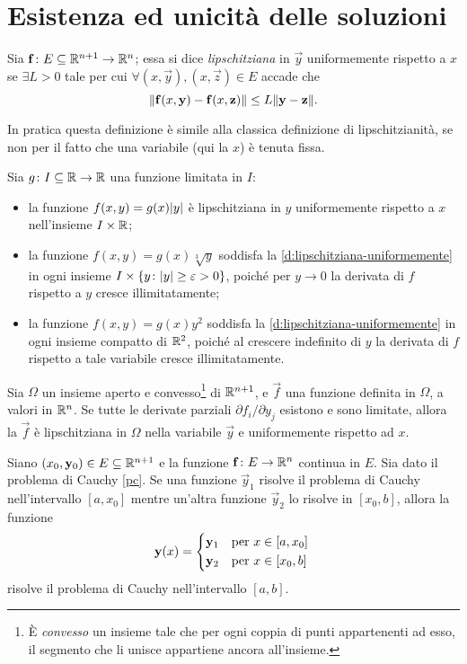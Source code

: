 \section{Esistenza ed unicità delle soluzioni}
\begin{definizione} \label{d:lipschitziana-uniformemente}
	Sia $\mathbf{f}\colon E\subseteq\mathbb{R}^{n+1}\to\mathbb{R}^n$; essa si dice \emph{lipschitziana} in $\vec y$ uniformemente rispetto a $x$ se $\exists L>0$ tale per cui $\forall(x,\vec y),(x,\vec z)\in E$ accade che
	\begin{equation}
		\lVert\mathbf{f}(x,\mathbf{y})-\mathbf{f}(x,\mathbf{z})\rVert\leq L\lVert\mathbf{y}-\mathbf{z}\rVert.
	\end{equation}
\end{definizione}
In pratica questa definizione è simile alla classica definizione di lipschitzianità, se non per il fatto che una variabile (qui la $x$) è tenuta fissa.
\begin{esempio} \label{es:lipschitziana-uniformemente}
	Sia $g\colon I\subseteq\mathbb{R}\to\mathbb{R}$ una funzione limitata in $I$:
	\begin{itemize}
		\item la funzione $f(x,y)=g(x)\lvert y\rvert$ è lipschitziana in $y$ uniformemente rispetto a $x$ nell'insieme $I\times\mathbb{R}$;
		\item la funzione $f(x,y)=g(x)\sqrt[3]{y}$ soddisfa la \ref{d:lipschitziana-uniformemente} in ogni insieme $I\times\{y\colon\lvert y\rvert\geq\varepsilon>0\}$, poiché per $y\to 0$ la derivata di $f$ rispetto a $y$ cresce illimitatamente;
		\item la funzione $f(x,y)=g(x)y^2$ soddisfa la \ref{d:lipschitziana-uniformemente} in ogni insieme compatto di $\mathbb{R}^2$, poiché al crescere indefinito di $y$ la derivata di $f$ rispetto a tale variabile cresce illimitatamente.
	\end{itemize}
\end{esempio}
\begin{osservazione}
	Sia $\Omega$ un insieme aperto e convesso\footnote{È \emph{convesso} un insieme tale che per ogni coppia di punti appartenenti ad esso, il segmento che li unisce appartiene ancora all'insieme.} di $\mathbb{R}^{n+1}$, e $\vec f$ una funzione definita in $\Omega$, a valori in $\mathbb{R}^n$.
	Se tutte le derivate parziali $\partial f_i/\partial y_j$ esistono e sono limitate, allora la $\vec f$ è lipschitziana in $\Omega$ nella variabile $\vec y$ e uniformemente rispetto ad $x$.
\end{osservazione}
\begin{lemma}[di saldatura] \label{l:saldatura}
	Siano $(x_0,\mathbf{y}_0)\in E\subseteq\mathbb{R}^{n+1}$ e la funzione $\mathbf{f}\colon E\to\mathbb{R}^n$ continua in $E$.
	Sia dato il problema di Cauchy \eqref{pc}.
	Se una funzione $\vec y_1$ risolve il problema di Cauchy nell'intervallo $[a,x_0]$ mentre un'altra funzione $\vec y_2$ lo risolve in $[x_0,b]$, allora la funzione
	\begin{equation*}
		\vec y(x)=
		\begin{cases*}
			\vec y_1&per $x\in[a,x_0]$\\
			\vec y_2&per $x\in[x_0,b]$
		\end{cases*}
	\end{equation*}
	risolve il problema di Cauchy nell'intervallo $[a,b]$.
\end{lemma}
